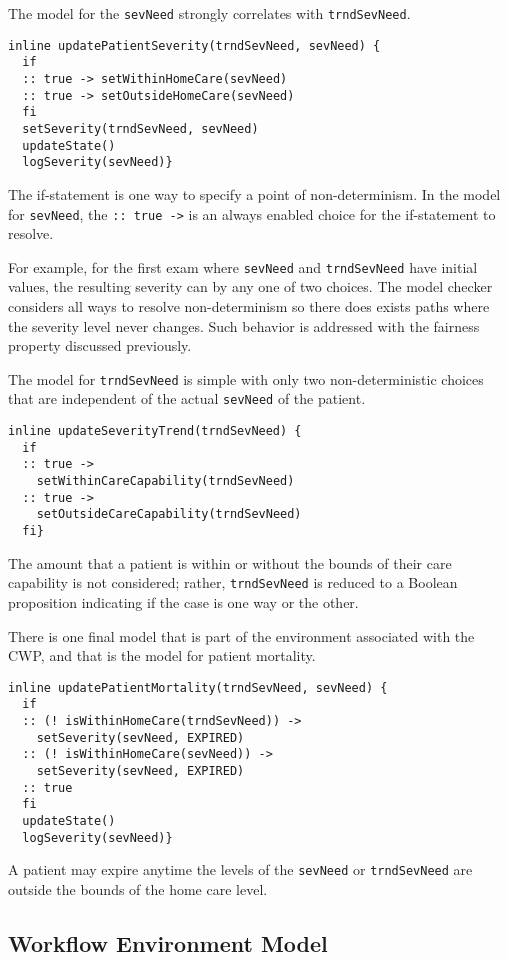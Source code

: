 The model for the \texttt{sevNeed} strongly correlates with \texttt{trndSevNeed}.
%
{\small
\begin{lstlisting}[style=myPromela]
inline updatePatientSeverity(trndSevNeed, sevNeed) {
  if
  :: true -> setWithinHomeCare(sevNeed)
  :: true -> setOutsideHomeCare(sevNeed)
  fi 
  setSeverity(trndSevNeed, sevNeed)
  updateState()
  logSeverity(sevNeed)}
\end{lstlisting}
}
%
\noindent The if-statement is one way to specify a point of non-determinism.
In the model for \texttt{sevNeed}, the \texttt{:: true ->} is an always enabled choice for the if-statement to resolve. 

For example, for the first exam where \texttt{sevNeed} and \texttt{trndSevNeed} have initial values, the resulting severity can by any one of two choices.
The model checker considers all ways to resolve non-determinism so there does exists paths where the severity level never changes.
Such behavior is addressed with the fairness property discussed previously.

The model for \texttt{trndSevNeed} is simple with only two non-deterministic choices that are independent of the actual \texttt{sevNeed} of the patient. 
%
{\small
\begin{lstlisting}[style=myPromela]
inline updateSeverityTrend(trndSevNeed) {
  if
  :: true -> 
    setWithinCareCapability(trndSevNeed)
  :: true -> 
    setOutsideCareCapability(trndSevNeed)
  fi}
\end{lstlisting}
}
%
\noindent The amount that a patient is within or without the bounds of their care capability is not considered;
rather, \texttt{trndSevNeed} is reduced to a Boolean proposition indicating if the case is one way or the other.

There is one final model that is part of the environment associated with the CWP, and that is the model for patient mortality. 
%
{\small
\begin{lstlisting}[style=myPromela]
inline updatePatientMortality(trndSevNeed, sevNeed) {
  if
  :: (! isWithinHomeCare(trndSevNeed)) -> 
    setSeverity(sevNeed, EXPIRED)
  :: (! isWithinHomeCare(sevNeed)) ->
    setSeverity(sevNeed, EXPIRED)
  :: true
  fi
  updateState()
  logSeverity(sevNeed)}
\end{lstlisting}
}
%
\noindent A patient may expire anytime the levels of the \texttt{sevNeed} or \texttt{trndSevNeed} are outside the bounds of the home care level.

\subsection{Workflow Environment Model}

